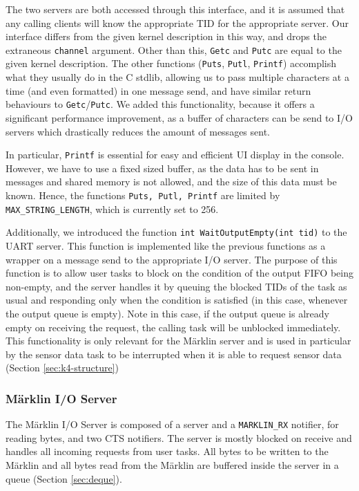 \documentclass[12pt, titlepage]{article}
\begin{document}
    The two servers are both accessed through this interface, and it is assumed that any calling clients will know the appropriate TID for the appropriate server. Our interface differs from the given kernel description in this way, and drops the extraneous \verb`channel` argument. Other than this, \verb'Getc' and \verb'Putc' are equal to the given kernel description. The other functions (\verb'Puts', \verb'Putl', \verb'Printf') accomplish what they usually do in the C stdlib, allowing us to pass multiple characters at a time (and even formatted) in one message send, and have similar return behaviours to \verb`Getc`/\verb`Putc`. We added this functionality, because it offers a significant performance improvement, as a buffer of characters can be send to I/O servers which drastically reduces the amount of messages sent. 
    
    In particular, \verb'Printf' is essential for easy and efficient UI display in the console.
    However, we have to use a fixed sized buffer, as the data has to be sent in messages and shared memory is not allowed, and the size of this data must be known.
    Hence, the functions \verb'Puts, Putl, Printf' are limited by \verb'MAX_STRING_LENGTH', which is currently set to 256.
    
    Additionally, we introduced the function \verb'int WaitOutputEmpty(int tid)' to the UART server.
    This function is implemented like the previous functions as a wrapper on a message send to the appropriate I/O server.
    The purpose of this function is to allow user tasks to block on the condition of the output FIFO being non-empty, and the server handles it by queuing the blocked TIDs of the task as usual and responding only when the condition is satisfied (in this case, whenever the output queue is empty).
    Note in this case, if the output queue is already empty on receiving the request, the calling task will be unblocked immediately.
    This functionality is only relevant for the Märklin server and is used in particular by the sensor data task to be interrupted when it is able to request sensor data (Section \ref{sec:k4-structure})

    \subsubsection{Märklin I/O Server}
    \label{sec:marklin-server}
    
    The Märklin I/O Server is composed of a server and a \verb`MARKLIN_RX` notifier, for reading bytes, and two CTS notifiers. 
    The server is mostly blocked on receive and handles all incoming requests from user tasks. 
    All bytes to be written to the Märklin and all bytes read from the Märklin are buffered inside the server in a queue (Section \ref{sec:deque}).
\end{document}
